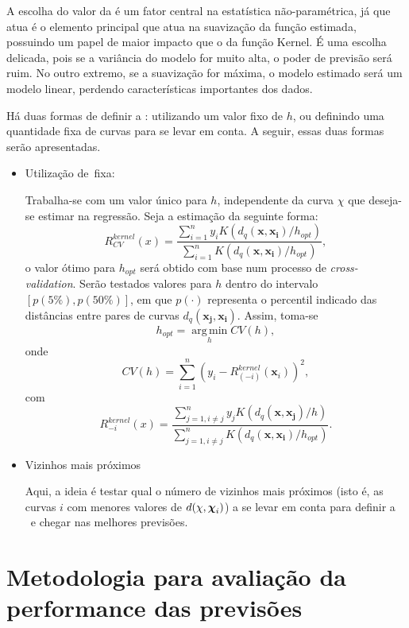 \documentclass[
	12pt,				%
	openright,			%
	oneside,			%
	a4paper,			%
	english,			%
	brazil				%
	]{dissertacao-ufrgs-abntex2}
\begin{document}
A escolha do valor da \bw é um fator central na estatística não-paramétrica, já que atua é o elemento principal que atua na suavização da função estimada, possuindo um papel de maior impacto que o da função Kernel. É uma escolha delicada, pois se a variância do modelo for muito alta, o poder de previsão será ruim. No outro extremo, se a suavização for máxima, o modelo estimado será um modelo linear, perdendo características importantes dos dados.


Há duas formas de definir a \bw: utilizando um valor fixo de $h$, ou definindo uma quantidade fixa de curvas para se levar em conta. A seguir, essas duas formas serão apresentadas.

\begin{itemize}

\item Utilização de \bw \,fixa:

Trabalha-se com um valor único para $h$, independente da curva $\chi$ que deseja-se estimar na regressão. Seja a estimação da seguinte forma:
\[
R_{CV}^{kernel}(x)=\dfrac{\sum_{i=1}^{n}y_{i}K(d_{q}(\boldsymbol{x},\boldsymbol{x_{i}})/h_{opt})}{\sum_{i=1}^{n}K(d_{q}(\boldsymbol{x},\boldsymbol{x_{i}})/h_{opt})},
\]
o valor ótimo para $h_{opt}$ será obtido com base num processo de \emph{cross-validation}. Serão testados valores para $h$ dentro do intervalo $[p(5\%),p(50\%)]$, em que $p(\cdot)$ representa o percentil indicado das distâncias entre pares de curvas $d_q(\boldsymbol{x_j},\boldsymbol{x_i})$. Assim, toma-se 
\[h_{opt} = \operatorname*{arg\,min}_h CV(h),\]
onde 
\[
CV(h) = \sum \limits_{i=1}^n \left(  y_i - R_{(-i)}^{kernel}(\boldsymbol{x}_i)  \right)^2, 
\]
com
\[
R_{-i}^{kernel}(x)=\dfrac{\sum \limits_{j=1,i \neq j}^{n}y_{j}K(d_{q}(\boldsymbol{x},\boldsymbol{x_{j}})/h)}{\sum \limits_{j=1,i \neq j}^{n}K(d_{q}(\boldsymbol{x},\boldsymbol{x_{i}})/h_{opt})}.
\]

\item Vizinhos mais próximos

Aqui, a ideia é testar qual o número de vizinhos mais próximos (isto é, as curvas $i$ com menores valores de $d(\chi,\boldsymbol{\chi}_i)$) a se levar em conta para definir a \bw~e chegar nas melhores previsões.

\end{itemize}


\section{Metodologia para avaliação da performance das previsões}
\end{document}
